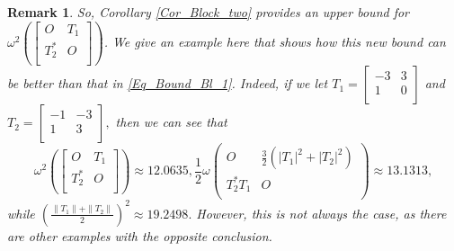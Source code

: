 \documentclass[12pt,twoside,reqno]{amsart}
\newtheorem{remark}{Remark}[section]
\numberwithin{equation}{section}
\begin{document}
\begin{remark}
So, Corollary \ref{Cor_Block_two} provides an upper bound for ${{\omega }^{2}}\left( \left[ \begin{matrix}
   O & {{T}_{1}}  \\
   T_{2}^{*} & O  \\
\end{matrix} \right] \right)$. We give an example here that shows how this new bound can be better than that in \eqref{Eq_Bound_Bl_1}. Indeed, if we let $T_1=\left[
\begin{array}{cc}
 -3 & 3 \\
 1 & 0 \\
\end{array}
\right]$ and $T_2=\left[
\begin{array}{cc}
 -1 & -3 \\
 1 & 3 \\
\end{array}
\right],$ then we can see that
\[{{\omega }^{2}}\left( \left[ \begin{matrix}
   O & {{T}_{1}}  \\
   T_{2}^{*} & O  \\
\end{matrix} \right] \right)\approx 12.0635, \frac{1}{2}\omega \left( \begin{matrix}
   O & \frac{3}{2}\left( {{\left| {{T}_{1}} \right|}^{2}}+{{\left| {{T}_{2}} \right|}^{2}} \right)  \\
   T_{2}^{*}{{T}_{1}} & O  \\
\end{matrix} \right)\approx 13.1313,\]
while $\left(\frac{\|T_1\|+\|T_2\|}{2}\right)^2\approx 19.2498.$ However, this is not always the case, as there are other examples with the opposite conclusion.
\end{remark}
\end{document}
